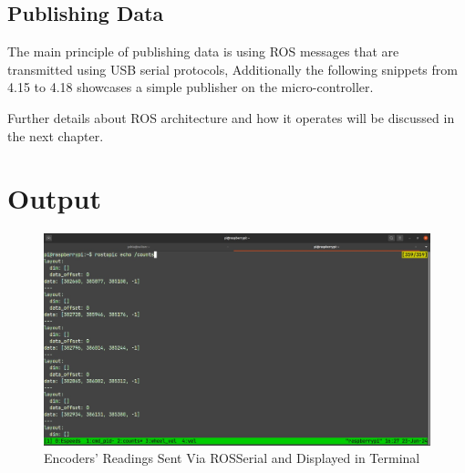 


\newpage

\subsection{Publishing Data}
The main principle of publishing data is using ROS messages that are transmitted using USB serial protocols, Additionally the following snippets from 4.15 to 4.18 showcases a simple publisher on the micro-controller. 
\vspace{1mm}

\vspace{1mm}

\vspace{1mm}

\vspace{1mm}

Further details about ROS architecture and how it operates will be discussed in the next chapter.

\newpage
\section{Output}

\begin{figure}[h!]
     \centering
     \includegraphics[scale=0.25]{./Figures/encoder.jpg}
     \caption{Encoders' Readings Sent Via ROSSerial and Displayed in Terminal}
     \label{fig:ref1}
\end{figure}

